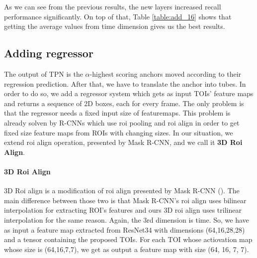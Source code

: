 \documentclass{report}
\begin{document}
As we can see from the previous results, the new layers increased recall performance significantly. On top of that, Table \ref{table:add_16} shows that
getting the average values from time dimension gives us the best results.


\subsection{Adding regressor}
The output of TPN is the $\alpha$-highest scoring anchors moved according to their regression prediction. After that, we have to translate the anchor into tubes.
In order to do so, we add a regressor system which gets as input TOIs' feature maps and returns a sequence of 2D boxes, each for every frame.
The only problem is that the regressor needs a fixed input size of featuremaps. This problem is already solven by R-CNNs which use roi pooling and roi align
in order to get fixed size feature maps from ROIs with changing sizes. In our situation, we extend roi align operation, presented by Mask R-CNN, and we
call it \textbf{3D Roi Align}.

\paragraph{3D Roi Align}
3D Roi align is a modification of roi align presented by Mask R-CNN (\cite{DBLP:journals/corr/HeGDG17}). The main difference between those two is that Mask R-CNN's roi align uses
bilinear interpolation for extracting ROI's features and ours 3D roi align uses trilinear interpolation for the same reason. Again, the 3rd dimension is
time.
So, we have as input a feature map extracted from ResNet34 with dimensions (64,16,28,28) and a tensor containing the proposed TOIs.
For each TOI whose actiovation map whose size is (64,16,7,7), we get as output a feature map with size (64, 16, 7, 7). \par
\end{document}
